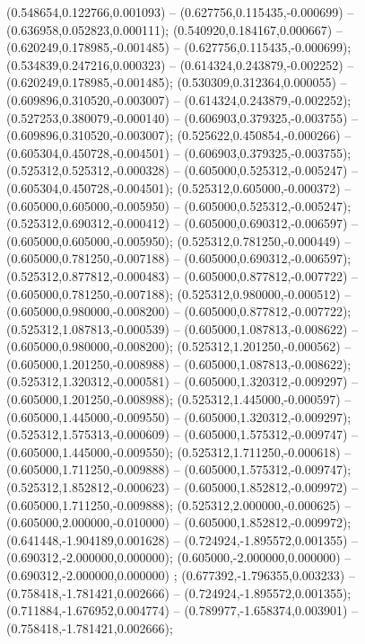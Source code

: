  (0.548654,0.122766,0.001093) -- (0.627756,0.115435,-0.000699) -- (0.636958,0.052823,0.000111);
 (0.540920,0.184167,0.000667) -- (0.620249,0.178985,-0.001485) -- (0.627756,0.115435,-0.000699);
 (0.534839,0.247216,0.000323) -- (0.614324,0.243879,-0.002252) -- (0.620249,0.178985,-0.001485);
 (0.530309,0.312364,0.000055) -- (0.609896,0.310520,-0.003007) -- (0.614324,0.243879,-0.002252);
 (0.527253,0.380079,-0.000140) -- (0.606903,0.379325,-0.003755) -- (0.609896,0.310520,-0.003007);
 (0.525622,0.450854,-0.000266) -- (0.605304,0.450728,-0.004501) -- (0.606903,0.379325,-0.003755);
 (0.525312,0.525312,-0.000328) -- (0.605000,0.525312,-0.005247) -- (0.605304,0.450728,-0.004501);
 (0.525312,0.605000,-0.000372) -- (0.605000,0.605000,-0.005950) -- (0.605000,0.525312,-0.005247);
 (0.525312,0.690312,-0.000412) -- (0.605000,0.690312,-0.006597) -- (0.605000,0.605000,-0.005950);
 (0.525312,0.781250,-0.000449) -- (0.605000,0.781250,-0.007188) -- (0.605000,0.690312,-0.006597);
 (0.525312,0.877812,-0.000483) -- (0.605000,0.877812,-0.007722) -- (0.605000,0.781250,-0.007188);
 (0.525312,0.980000,-0.000512) -- (0.605000,0.980000,-0.008200) -- (0.605000,0.877812,-0.007722);
 (0.525312,1.087813,-0.000539) -- (0.605000,1.087813,-0.008622) -- (0.605000,0.980000,-0.008200);
 (0.525312,1.201250,-0.000562) -- (0.605000,1.201250,-0.008988) -- (0.605000,1.087813,-0.008622);
 (0.525312,1.320312,-0.000581) -- (0.605000,1.320312,-0.009297) -- (0.605000,1.201250,-0.008988);
 (0.525312,1.445000,-0.000597) -- (0.605000,1.445000,-0.009550) -- (0.605000,1.320312,-0.009297);
 (0.525312,1.575313,-0.000609) -- (0.605000,1.575312,-0.009747) -- (0.605000,1.445000,-0.009550);
 (0.525312,1.711250,-0.000618) -- (0.605000,1.711250,-0.009888) -- (0.605000,1.575312,-0.009747);
 (0.525312,1.852812,-0.000623) -- (0.605000,1.852812,-0.009972) -- (0.605000,1.711250,-0.009888);
 (0.525312,2.000000,-0.000625) -- (0.605000,2.000000,-0.010000) -- (0.605000,1.852812,-0.009972);
 (0.641448,-1.904189,0.001628) -- (0.724924,-1.895572,0.001355) -- (0.690312,-2.000000,0.000000);
 (0.605000,-2.000000,0.000000) -- (0.690312,-2.000000,0.000000) ;
 (0.677392,-1.796355,0.003233) -- (0.758418,-1.781421,0.002666) -- (0.724924,-1.895572,0.001355);
 (0.711884,-1.676952,0.004774) -- (0.789977,-1.658374,0.003901) -- (0.758418,-1.781421,0.002666);
